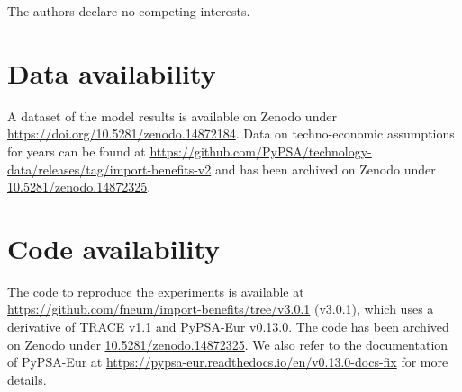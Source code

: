 \documentclass[1p,11pt]{elsarticle}
\renewcommand{\ttdefault}{\sfdefault}
\begin{document}
The authors declare no competing interests.

\section*{Data availability}

A dataset of the model results is available on Zenodo under
\url{https://doi.org/10.5281/zenodo.14872184}. Data on techno-economic
assumptions for years can be found at
\url{https://github.com/PyPSA/technology-data/releases/tag/import-benefits-v2}
and has been archived on Zenodo under \url{10.5281/zenodo.14872325}.

\section*{Code availability}

The code to reproduce the experiments is available at
\url{https://github.com/fneum/import-benefits/tree/v3.0.1} (v3.0.1), which uses a
derivative of TRACE v1.1 and PyPSA-Eur v0.13.0. The code has been archived on
Zenodo under \url{10.5281/zenodo.14872325}. We also refer to the documentation
of PyPSA-Eur at \url{https://pypsa-eur.readthedocs.io/en/v0.13.0-docs-fix} for more
details.

\renewcommand{\ttdefault}{\sfdefault}
% 


\setcounter{LastMainFigure}{\value{figure}}
\end{document}
